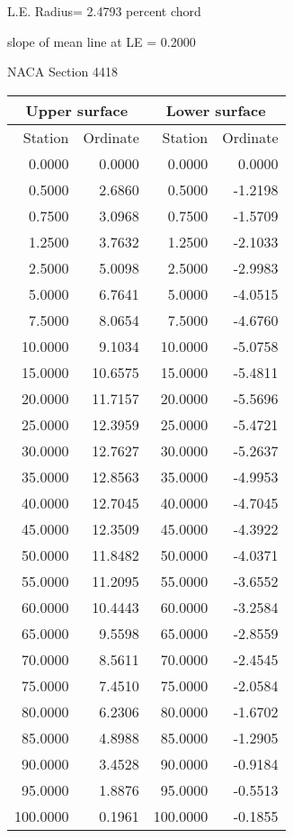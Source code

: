 \documentclass[11pt]{book}
\begin{document}
L.E. Radius=  2.4793 percent chord


 slope of mean line at LE =  0.2000
 \newpage
  \label{s4418}
 \begin{Large}
 NACA Section 4418
 \end{Large}
  
 \vspace{8mm}
 \begin{tabular}{|r|r|r|r|} \hline 
 \multicolumn{2}{|c|}{Upper surface} & \multicolumn{2}{|c|}{Lower surface} \\
 \hline
 Station & Ordinate & Station & Ordinate \\
 \hline
0.0000 & 0.0000 & 0.0000 & 0.0000 \\
0.5000 & 2.6860 & 0.5000 & -1.2198 \\
0.7500 & 3.0968 & 0.7500 & -1.5709 \\
1.2500 & 3.7632 & 1.2500 & -2.1033 \\
2.5000 & 5.0098 & 2.5000 & -2.9983 \\
5.0000 & 6.7641 & 5.0000 & -4.0515 \\
7.5000 & 8.0654 & 7.5000 & -4.6760 \\
10.0000 & 9.1034 & 10.0000 & -5.0758 \\
15.0000 & 10.6575 & 15.0000 & -5.4811 \\
20.0000 & 11.7157 & 20.0000 & -5.5696 \\
25.0000 & 12.3959 & 25.0000 & -5.4721 \\
30.0000 & 12.7627 & 30.0000 & -5.2637 \\
35.0000 & 12.8563 & 35.0000 & -4.9953 \\
40.0000 & 12.7045 & 40.0000 & -4.7045 \\
45.0000 & 12.3509 & 45.0000 & -4.3922 \\
50.0000 & 11.8482 & 50.0000 & -4.0371 \\
55.0000 & 11.2095 & 55.0000 & -3.6552 \\
60.0000 & 10.4443 & 60.0000 & -3.2584 \\
65.0000 & 9.5598 & 65.0000 & -2.8559 \\
70.0000 & 8.5611 & 70.0000 & -2.4545 \\
75.0000 & 7.4510 & 75.0000 & -2.0584 \\
80.0000 & 6.2306 & 80.0000 & -1.6702 \\
85.0000 & 4.8988 & 85.0000 & -1.2905 \\
90.0000 & 3.4528 & 90.0000 & -0.9184 \\
95.0000 & 1.8876 & 95.0000 & -0.5513 \\
100.0000 & 0.1961 & 100.0000 & -0.1855 \\
 \hline 
 \end{tabular}
\end{document}
